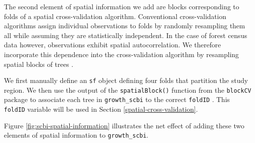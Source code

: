 \documentclass[12pt]{article}
\begin{document}
The second element of spatial information we add are blocks
corresponding to folds of a spatial cross-validation algorithm.
Conventional cross-validation algorithms assign individual observations
to folds by randomly resampling them all while assuming they are
statistically independent. In the case of forest census data however,
observations exhibit spatial autocorrelation. We therefore incorporate
this dependence into the cross-validation algorithm by resampling
spatial blocks of trees \citep[
\citet{pohjankukka_estimating_2017}]{roberts_cross-validation_2017}.

We first manually define an \texttt{sf} object defining four folds that
partition the study region. We then use the output of the
\texttt{spatialBlock()} function from the \texttt{blockCV} package to
associate each tree in \texttt{growth\_scbi} to the correct
\texttt{foldID} \citep{valavi_blockcv_2019}. This \texttt{foldID}
variable will be used in Section \ref{spatial-cross-validation}.

Figure \ref{fig:scbi-spatial-information} illustrates the net effect of
adding these two elements of spatial information to
\texttt{growth\_scbi}.
\end{document}
